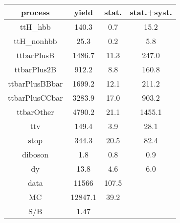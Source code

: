 \begin{tabular}{cccc}
\hline
    process     &  yield  &  stat.  &  stat.+syst.  \\
\hline
    ttH\_hbb     &  140.3  &   0.7   &     15.2      \\
   ttH\_nonhbb   &  25.3   &   0.2   &      5.8      \\
   ttbarPlusB   & 1486.7  &  11.3   &     247.0     \\
  ttbarPlus2B   &  912.2  &   8.8   &     160.8     \\
 ttbarPlusBBbar & 1699.2  &  12.1   &     211.2     \\
 ttbarPlusCCbar & 3283.9  &  17.0   &     903.2     \\
   ttbarOther   & 4790.2  &  21.1   &    1455.1     \\
      ttv       &  149.4  &   3.9   &     28.1      \\
      stop      &  344.3  &  20.5   &     82.4      \\
    diboson     &   1.8   &   0.8   &      0.9      \\
       dy       &  13.8   &   4.6   &      6.0      \\
      data      &  11566  &  107.5  &               \\
       MC       & 12847.1 &  39.2   &               \\
      S/B       &  1.47   &         &               \\
\hline
\end{tabular}